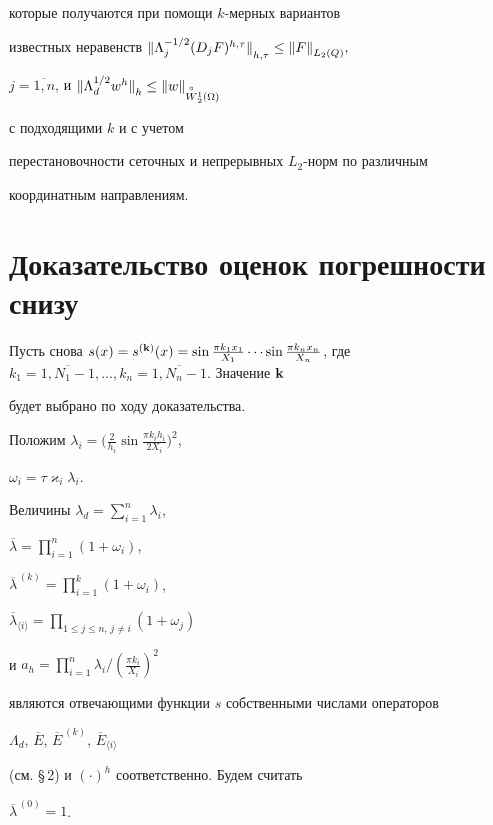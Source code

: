 которые получаются при помощи $k$-мерных вариантов


известных неравенств ${\ver \Lambda_j^{-1/2}(D_jF)^{h,\tau}


\ver}_{h,\tau}\le{\ver F\ver}_{L_2(Q)},$


$j=\overline{1,n}$, и ${\ver \Lambda_d^{1/2}w^h\ver}_{h}\le


{\ver w\ver}_{\overset{\circ}{W}{}^1_2(\Omega)}$


с подходящими $k$ и с учетом 


перестановочности сеточных и непрерывных $L_2$-норм по различным


координатным направлениям.





\section{Доказательство оценок погрешности снизу}





Пусть снова  $s(x)=s^{(\bold k)}(x)=\sin\tfrac{\pi k_1x_1}{X_1}\dotsb


\sin\tfrac{\pi k_nx_n}{X_n}$, где $k_1=\overline{1,N_1-1},\dotsc,


k_n=\overline{1,N_n-1}$. Значение $\bold k$


будет выбрано по ходу доказательства.


Положим $\lambda_i=\bigl(\tfrac{2}{h_i}\sin\tfrac{\pi k_ih_i}{2X_i}\bigr)^2$,


$\omega_i=\tau\varkappa_i\lambda_i$.


Величины $\lambda_d=\sum_{i=1}^n\lambda_i$, 


$\overline\lambda=\prod_{i=1}^n(1+\omega_i)$, 


$\overline\lambda^{\,(k)}=\prod_{i=1}^k(1+\omega_i)$,


$\overline\lambda_{\langle i\rangle}=\prod_{1\le j\le n,\, j\ne i}(1+\omega_j)$


и $a_h=\prod_{i=1}^n\lambda_i/(\frac{\pi k_i}{X_i})^2$


являются отвечающими функции $s$ собственными числами операторов 


$\Lambda_d$, $\overline E$, $\overline E^{\,(k)}$, $\overline E_{\langle i\rangle}$


(см. \S\,2) и $(\cdot)^h$ соответственно. Будем считать


$\overline\lambda^{\,(0)}=1$.





